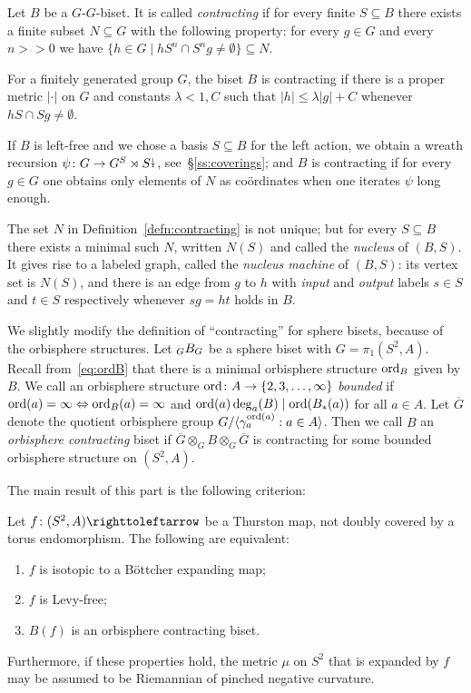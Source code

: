 \documentclass{amsart}
\begin{document}
\begin{defn}\label{defn:contracting}
  Let $B$ be a $G$-$G$-biset. It is called \emph{contracting} if for
  every finite $S\subseteq B$ there
  exists a finite subset $N\subseteq G$ with the following property:
  for every $g\in G$ and every $n>\!\!>0$ we have
  $\{h\in G\mid h S^n\cap S^n g\neq\emptyset\}\subseteq N$.
\end{defn}
For a finitely generated group $G$, the biset $B$ is contracting if
there is a proper metric $|\cdot|$ on $G$ and constants $\lambda<1,C$
such that $|h|\le\lambda|g|+C$ whenever $h S\cap S g\neq\emptyset$.

If $B$ is left-free and we chose a basis $S\subseteq B$ for the left
action, we obtain a wreath recursion
$\psi\colon G\to G^S\rtimes S{\stackrel{\downarrow}{\smash.}}$, see~\S\ref{ss:coverings}; and $B$
is contracting if for every $g\in G$ one obtains only elements of $N$
as co\"ordinates when one iterates $\psi$ long enough.

The set $N$ in Definition~\ref{defn:contracting} is not unique; but
for every $S\subseteq B$ there exists a minimal such $N$, written
$N(S)$ and called the \emph{nucleus} of $(B,S)$. It gives rise to a
labeled graph, called the \emph{nucleus machine} of $(B,S)$: its
vertex set is $N(S)$, and there is an edge from $g$ to $h$ with
\emph{input} and \emph{output} labels $s\in S$ and $t\in S$
respectively whenever $s g=ht$ holds in $B$.

We slightly modify the definition of ``contracting'' for sphere bisets,
because of the orbisphere structures. Let $\subscript GB_G$ be a sphere biset with
$G=\pi_1(S^2,A)$. Recall from~\eqref{eq:ordB} that there is a minimal
orbisphere structure $\operatorname{ord}_B$ given by $B$. We call an orbisphere structure
$\operatorname{ord}\colon A\to\{2,3,\dots,\infty\}$ \emph{bounded} if
$\operatorname{ord}(a)=\infty\Leftrightarrow\operatorname{ord}_B(a)=\infty$ and
$\operatorname{ord}(a)\deg_a(B)\mid\operatorname{ord}(B_*(a))$ for all $a\in A$. Let $\overline G$
denote the quotient orbisphere group $G/\langle\gamma_a^{\operatorname{ord}(a)}:a\in
A\rangle$. Then we call $B$ an \emph{orbisphere contracting} biset if
$\overline G\otimes_G B\otimes_G\overline G$ is contracting for some
bounded orbisphere structure on $(S^2,A)$.

\noindent The main result of this part is the following criterion:
\begin{mainthm}\label{thm:ExpCr} 
  Let $f\colon(S^2,A)\selfmap$ be a Thurston map, not doubly covered
  by a torus endomorphism. The following are equivalent:
  \begin{enumerate}
  \item $f$ is isotopic to a B\"ottcher expanding map;
  \item $f$ is Levy-free;
  \item $B(f)$ is an orbisphere contracting biset.
  \end{enumerate}

  Furthermore, if these properties hold, the metric $\mu$ on $S^2$
  that is expanded by $f$ may be assumed to be Riemannian of pinched
  negative curvature.
\end{mainthm}
\end{document}
